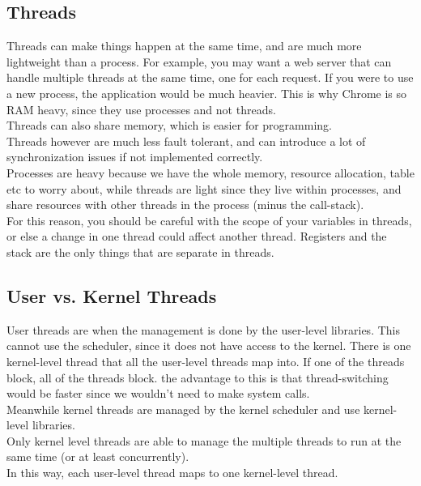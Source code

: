 \documentclass[12pt]{article}
\theoremstyle{definition}
\begin{document}
\subsection{Threads}
Threads can make things happen at the same time, and are much more lightweight than a process. For example, you may want a web server that can handle multiple threads at the same time, one for each request. If you were to use a new process, the application would be much heavier. This is why Chrome is so RAM heavy, since they use processes and not threads.
\\ \linebreak
Threads can also share memory, which is easier for programming.
\\ \linebreak
Threads however are much less fault tolerant, and can introduce a lot of synchronization issues if not implemented correctly.
\\ \linebreak
Processes are heavy because we have the whole memory, resource allocation, table etc to worry about, while threads are light since they live within processes, and share resources with other threads in the process (minus the call-stack).
\\ \linebreak
For this reason, you should be careful with the scope of your variables in threads, or else a change in one thread could affect another thread. Registers and the stack are the only things that are separate in threads.
\\ \linebreak

\subsection{User vs. Kernel Threads}
User threads are when the management is done by the user-level libraries. This cannot use the scheduler, since it does not have access to the kernel. There is one kernel-level thread that all the user-level threads map into. If one of the threads block, all of the threads block. the advantage to this is that thread-switching would be faster since we wouldn't need to make system calls.
\\ \linebreak
Meanwhile kernel threads are managed by the kernel scheduler and use kernel-level libraries.
\\ \linebreak
Only kernel level threads are able to manage the multiple threads to run at the same time (or at least concurrently).
\\ \linebreak
In this way, each user-level thread maps to one kernel-level thread.
\end{document}
